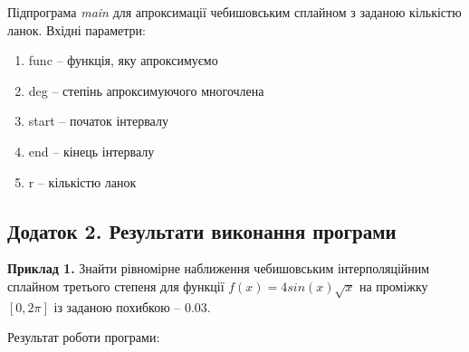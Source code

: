 \documentclass[ukrainian,14pt]{extarticle}
\begin{document}


\vspace{1cm}

Підпрограма \textit{main} для апроксимації чебишовським сплайном з заданою кількістю ланок.
Вхідні параметри:
\begin{enumerate}
    \item func – функція, яку апроксимуємо
    \item deg – степінь апроксимуючого многочлена
    \item start – початок інтервалу
    \item end – кінець інтервалу
    \item r – кількістю ланок
\end{enumerate}


\newpage


\subsection*{Додаток 2. Результати виконання програми}

\textbf{Приклад 1.} Знайти рівномірне наближення чебишовським інтерполяційним сплайном третього степеня для функції $f(x) = 4sin(x) \sqrt{x}$ на проміжку $[0, 2\pi]$ із заданою похибкою – $0.03$.


Результат роботи програми:
\end{document}
